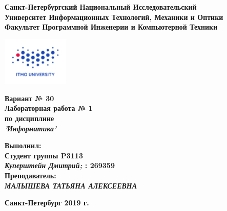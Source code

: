 \documentclass[11pt]{article}
\author{АВТОР}
\date{\today}
\title{}
\begin{document}
\large
\thispagestyle{empty}
\begin{center}
\textbf{Санкт-Петербургский Национальный Исследовательский}\\
\textbf{Университет Информационных Технологий, Механики и Оптики}\\
\textbf{Факультет Программной Инженерии и Компьютерной Техники}\\
\end{center}
\vspace{1em}
\begin{center}
\includegraphics[width=120px]{../../../itmo-logo.png}
\end{center}
\LARGE
\vspace{5em}
\begin{center}
\textbf{Вариант № 30}\\
\textbf{Лабораторная работа № 1}\\
\Large
\textbf{по дисциплине}\\
\LARGE
\textbf{\emph{'Информатика'}}\\
\end{center}
\vspace{11em}
\large
\begin{flushright}
\textbf{Выполнил:}\\
\textbf{Студент группы P3113}\\
\textbf{\emph{Куперштейн Дмитрий;} : 269359}\\
\textbf{Преподаватель:}\\
\textbf{\emph{МАЛЫШЕВА ТАТЬЯНА АЛЕКСЕЕВНА}}\\
\end{flushright}
\vspace{4em}
\large
\begin{center}
\textbf{Санкт-Петербург 2019 г.}
\end{center}
\pagebreak{}
\setcounter{tocdepth}{2}
\renewcommand{\contentsname}{Оглавление}
\tableofcontents
\pagebreak{}
\end{document}
